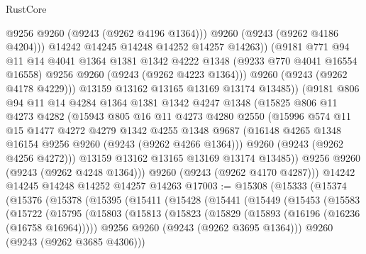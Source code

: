 \begin{lexlean}{RustCore}
\begin{coremodule}
                    @9256
                    @9260
                    (@9243 (@9262 @4196 @1364)))
                  @9260
                  (@9243 (@9262 @4186 @4204)))
                @14242
                @14245
                @14248
                @14252
                @14257
                @14263))
            (@9181
              @771
              @94
              @11
              @14
              @4041
              @1364
              @1381
              @1342
              @4222
              @1348
              (@9233 @770 @4041 @16554 @16558)
              @9256
              @9260
              (@9243 (@9262 @4223 @1364)))
            @9260
            (@9243 (@9262 @4178 @4229)))
          @13159
          @13162
          @13165
          @13169
          @13174
          @13485))
      (@9181
        @806
        @94
        @11
        @14
        @4284
        @1364
        @1381
        @1342
        @4247
        @1348
        (@15825
          @806
          @11
          @4273
          @4282
          (@15943
            @805
            @16
            @11
            @4273
            @4280
            @2550
            (@15996
              @574
              @11
              @15
              @1477
              @4272
              @4279
              @1342
              @4255
              @1348
              @9687
              (@16148 @4265 @1348 @16154 @9256 @9260 (@9243 (@9262 @4266 @1364)))
              @9260
              (@9243 (@9262 @4256 @4272)))
            @13159
            @13162
            @13165
            @13169
            @13174
            @13485))
        @9256
        @9260
        (@9243 (@9262 @4248 @1364)))
      @9260
      (@9243 (@9262 @4170 @4287)))
    @14242
    @14245
    @14248
    @14252
    @14257
    @14263
@17003 := @15308
    (@15333
      (@15374
        (@15376
          (@15378
            (@15395
              (@15411
                (@15428
                  (@15441
                    (@15449
                      (@15453
                        (@15583
                          (@15722
                            (@15795
                              (@15803
                                (@15813
                                  (@15823
                                    (@15829 (@15893 (@16196 (@16236 (@16758 @16964)))))
                                    @9256
                                    @9260
                                    (@9243 (@9262 @3695 @1364)))
                                  @9260
                                  (@9243 (@9262 @3685 @4306)))

\end{coremodule}
\end{lexlean}
